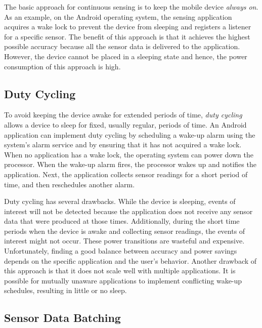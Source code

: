 The basic approach for continuous sensing is to keep the mobile device
\emph{always on}.  As an example, on the Android operating system, the
sensing application acquires a wake lock to prevent the device from
sleeping and registers a listener for a specific sensor.  The benefit
of this approach is that it achieves the highest possible accuracy
because all the sensor data is delivered to the application.  However,
the device cannot be placed in a sleeping state and hence, the power
consumption of this approach is high.

\subsection{Duty Cycling}

To avoid keeping the device awake for extended periods of time,
\emph{duty cycling} allows a device to sleep for fixed, usually
regular, periods of time.  An Android application can implement
duty cycling by scheduling a wake-up alarm using the system's alarm
service and by ensuring that it has not acquired a wake lock.  When no
application has a wake lock, the operating system can power down the
processor.  When the wake-up alarm fires, the processor wakes up and
notifies the application.  Next, the application collects sensor
readings for a short period of time, and then reschedules another
alarm.

Duty cycling has several drawbacks.  While the device is sleeping,
events of interest will not be detected because the application does
not receive any sensor data that were produced at those times.
Additionally, during the short time periods when the device is awake
and collecting sensor readings, the events of interest might not
occur.  These power transitions are wasteful and expensive.
Unfortunately, finding a good balance between accuracy and power
savings depends on the specific application and the user's behavior.
Another drawback of this approach is that it does not scale well with
multiple applications.  It is possible for mutually unaware
applications to implement conflicting wake-up schedules, resulting in
little or no sleep.

\subsection{Sensor Data Batching}

